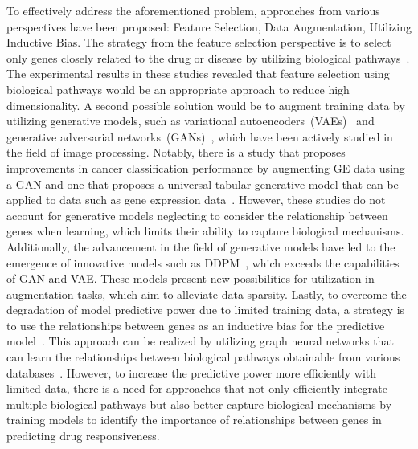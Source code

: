 \documentclass[runningheads]{llncs}
\begin{document}
To effectively address the aforementioned problem, approaches from
various perspectives have been proposed: Feature Selection, Data
Augmentation, Utilizing Inductive Bias. The strategy from the feature
selection perspective is to select only genes closely related to the
drug or disease by utilizing biological pathways~\cite{9, 14}. The
experimental results in these studies revealed that feature selection
using biological pathways would be an appropriate approach to reduce
high dimensionality. A second possible solution would be to augment
training data by utilizing generative models, such as variational
autoencoders~(VAEs)~\cite{4} and generative adversarial networks~(GANs)~\cite{19}, which have been actively studied in the field of image
processing. Notably, there is a study that proposes improvements in
cancer classification performance by augmenting GE data using a GAN
and one that proposes a universal tabular generative model that can be
applied to data such as gene expression data~\cite{5, 35}. However, these studies do not
account for generative models neglecting to consider the relationship
between genes when learning, which limits their ability to capture
biological mechanisms. Additionally, the advancement in the field of
generative models have led to the emergence of innovative models such
as DDPM~\cite{17, 32}, which exceeds the capabilities of GAN and VAE. These models present new possibilities for utilization in augmentation tasks, which aim to alleviate data sparsity. Lastly, to overcome the degradation of model predictive power due to limited training data, a strategy is to use the relationships between genes as an inductive bias for the predictive model~\cite{3, 15}. This approach can
be realized by utilizing graph neural networks that can learn the
relationships between biological pathways obtainable from various
databases~\cite{20}. However, to increase the predictive power
more efficiently with limited data, there is a need for approaches
that not only efficiently integrate multiple biological pathways but
also better capture biological mechanisms by training models to
identify the importance of relationships between genes in predicting
drug responsiveness.
\end{document}
